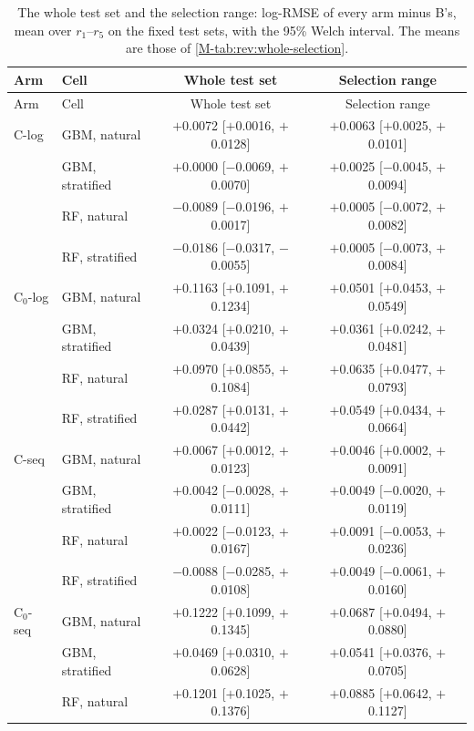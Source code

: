 \begin{longtable}{llcc}
\caption{The whole test set and the selection range: log-RMSE of every arm minus B's, mean over $r_1$--$r_5$ on the fixed test sets, with the 95\% Welch interval. The means are those of \cref{M-tab:rev:whole-selection}.}\label{tab:rev:whole-selection-intervals}\\
\toprule
Arm & Cell & Whole test set & Selection range \\
\midrule
\endfirsthead
\toprule
Arm & Cell & Whole test set & Selection range \\
\midrule
\endhead
C-log & GBM, natural & $+$0.0072 [$+$0.0016, $+$0.0128] & $+$0.0063 [$+$0.0025, $+$0.0101] \\
 & GBM, stratified & $+$0.0000 [$-$0.0069, $+$0.0070] & $+$0.0025 [$-$0.0045, $+$0.0094] \\
 & RF, natural & $-$0.0089 [$-$0.0196, $+$0.0017] & $+$0.0005 [$-$0.0072, $+$0.0082] \\
 & RF, stratified & $-$0.0186 [$-$0.0317, $-$0.0055] & $+$0.0005 [$-$0.0073, $+$0.0084] \\
\addlinespace
C$_0$-log & GBM, natural & $+$0.1163 [$+$0.1091, $+$0.1234] & $+$0.0501 [$+$0.0453, $+$0.0549] \\
 & GBM, stratified & $+$0.0324 [$+$0.0210, $+$0.0439] & $+$0.0361 [$+$0.0242, $+$0.0481] \\
 & RF, natural & $+$0.0970 [$+$0.0855, $+$0.1084] & $+$0.0635 [$+$0.0477, $+$0.0793] \\
 & RF, stratified & $+$0.0287 [$+$0.0131, $+$0.0442] & $+$0.0549 [$+$0.0434, $+$0.0664] \\
\addlinespace
C-seq & GBM, natural & $+$0.0067 [$+$0.0012, $+$0.0123] & $+$0.0046 [$+$0.0002, $+$0.0091] \\
 & GBM, stratified & $+$0.0042 [$-$0.0028, $+$0.0111] & $+$0.0049 [$-$0.0020, $+$0.0119] \\
 & RF, natural & $+$0.0022 [$-$0.0123, $+$0.0167] & $+$0.0091 [$-$0.0053, $+$0.0236] \\
 & RF, stratified & $-$0.0088 [$-$0.0285, $+$0.0108] & $+$0.0049 [$-$0.0061, $+$0.0160] \\
\addlinespace
C$_0$-seq & GBM, natural & $+$0.1222 [$+$0.1099, $+$0.1345] & $+$0.0687 [$+$0.0494, $+$0.0880] \\
 & GBM, stratified & $+$0.0469 [$+$0.0310, $+$0.0628] & $+$0.0541 [$+$0.0376, $+$0.0705] \\
 & RF, natural & $+$0.1201 [$+$0.1025, $+$0.1376] & $+$0.0885 [$+$0.0642, $+$0.1127] \\

\end{longtable}
